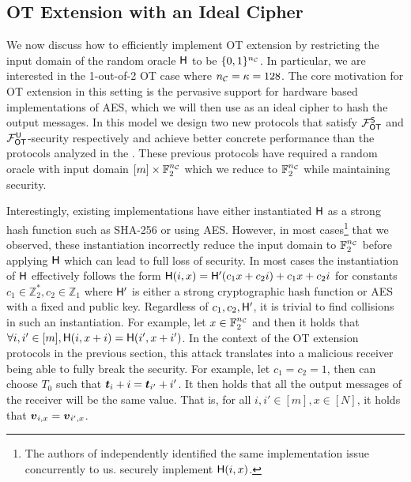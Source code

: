 \subsection{OT Extension with an Ideal Cipher}
We now discuss how to efficiently implement OT extension by restricting the input domain of the random oracle $\H$ to be $\{0,1\}^\nc$. In particular, we are interested in the 1-out-of-2 OT case where $\nc=\kappa=128$. The core motivation for OT extension in this setting is the pervasive support for hardware based implementations of AES, which we will then use as an ideal cipher to hash the output messages. In this model we design two new protocols that satisfy $\OOT^\send$ and $\OOT^\U$-security respectively and achieve better concrete performance than the protocols analyzed in the . These previous protocols have required a random oracle with input domain $[m]\times \mathbb{F}^\nc_2$ which we reduce to $\mathbb{F}^\nc_2$ while maintaining security. 

Interestingly, existing implementations\cite{libOTe,encrypto,KOS,EMP} have either instantiated $\H$ as a strong hash function such as SHA-256 or using AES. However, in most cases\footnote{\label{empNote}The authors of \cite{EMP} independently identified the same implementation issue concurrently to us. \cite{EMP} securely implement $\H(i,x)$. } that we observed\cite{libOTe,encrypto,KOS}, these instantiation incorrectly reduce the input domain to $\mathbb{F}^\nc_2$ before applying $\H$ which can lead to full loss of security. In most cases the instantiation of $\H$ effectively follows the form $\H(i,x)=\H'(c_1 x + c_2 i) + c_1 x + c_2 i$ for constants $c_1\in\mathbb{Z}^*_2,c_2\in\mathbb{Z}_1$ where $\H'$ is either a strong cryptographic hash function or AES with a fixed and public key. Regardless of $c_1,c_2,\H'$, it is trivial to find collisions in such an instantiation. For example, let $x\in\mathbb{F}^\nc_2$ and then it holds that $\forall i,i'\in[m], \H(i,x+i)=\H(i', x+i')$. In the context of the OT extension protocols in the previous section, this attack translates into a malicious receiver being able to fully break the security. For example, let $c_1=c_2=1$, then \rec can choose $T_0$ such that $\tt_i+i=\tt_{i'}+i'$. It then holds that all the output messages of the receiver will be the same value.  That is, for all $i,i'\in[m],x\in[N]$, it holds that $\vv_{i,x}=\vv_{i',x}$. 


